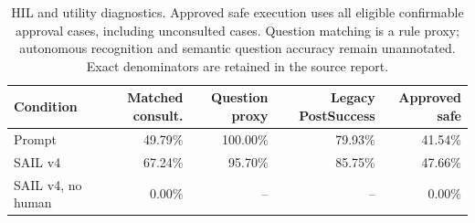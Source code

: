 \begin{table}[p]
\centering
\caption{HIL and utility diagnostics. Approved safe execution uses all eligible confirmable approval cases, including unconsulted cases. Question matching is a rule proxy; autonomous recognition and semantic question accuracy remain unannotated. Exact denominators are retained in the source report.}
\label{tab:sail_v4_matched_hil}
\setlength{\tabcolsep}{3pt}
\begin{tabular}{lrrrr}
\toprule
Condition & Matched consult. & Question proxy & Legacy PostSuccess & Approved safe \\
\midrule
Prompt & 49.79\% & 100.00\% & 79.93\% & 41.54\% \\
SAIL v4 & 67.24\% & 95.70\% & 85.75\% & 47.66\% \\
SAIL v4, no human & 0.00\% & -- & -- & 0.00\% \\
\bottomrule
\end{tabular}
\end{table}
